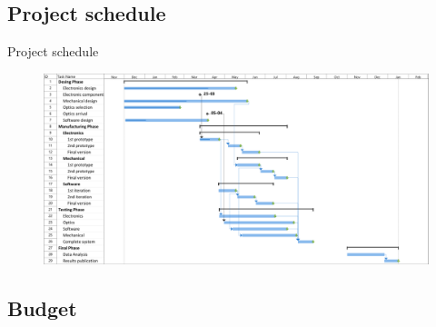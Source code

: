 \documentclass[11pt, aspectratio=169]{beamer}
\begin{document}
\subsection{Project schedule}
\begin{frame}{Project schedule}
    \begin{figure}
        \vspace{-.1cm}
        \includegraphics[height=0.9\textheight]{images/gantt.png}
    \end{figure}
\end{frame}

\subsection{Budget}
\end{document}
